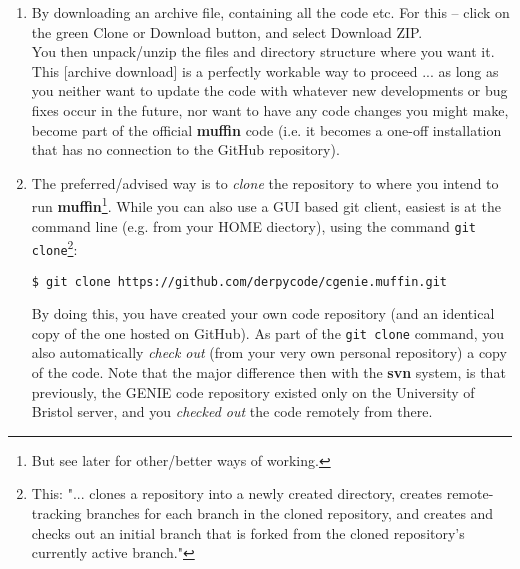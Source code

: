 \documentclass[11pt,fleqn]{book} %
\begin{document}
\begin{enumerate}

\vspace{1mm}
\item By downloading an archive file, containing all the code etc. For this -- click on the \textcolor[rgb]{0,0.501961,0}{green} \textsf{\small{Clone or Download}} button, and select \textsf{\small{Download ZIP}}.
\\You then unpack/unzip the files and directory structure where you want it.
\\This [archive download] is a perfectly workable way to proceed ... as long as you neither want to update the code with whatever new developments or bug fixes occur in the future, nor want to have any code changes you might make, become part of the official \textbf{muffin} code  (i.e. it becomes a one-off installation that has no connection to the GitHub repository).

\vspace{1mm}
\item The preferred/advised way is to \textit{clone} the repository to where you intend to run \textbf{muffin}\footnote{But see later for other/better ways of working.}. While you can also use a GUI based git client, easiest is at the command line (e.g. from your HOME diectory), using the command \texttt{git clone}\footnote{This: "... clones a repository into a newly created directory, creates remote-tracking branches for each branch in the cloned repository, and creates and checks out an initial branch that is forked from the cloned repository’s currently active branch."}:

\begin{verbatim}
$ git clone https://github.com/derpycode/cgenie.muffin.git
\end{verbatim}

By doing this, you have created your own code repository (and an identical copy of the one hosted on GitHub). As part of the \texttt{git clone} command, you also automatically \textit{check out} (from your very own personal repository) a copy of the code. Note that the major difference then with the \textbf{svn} system, is that previously, the GENIE code repository existed only on the University of Bristol server, and you \textit{checked out} the code remotely from there.

\end{enumerate}

\end{document}
